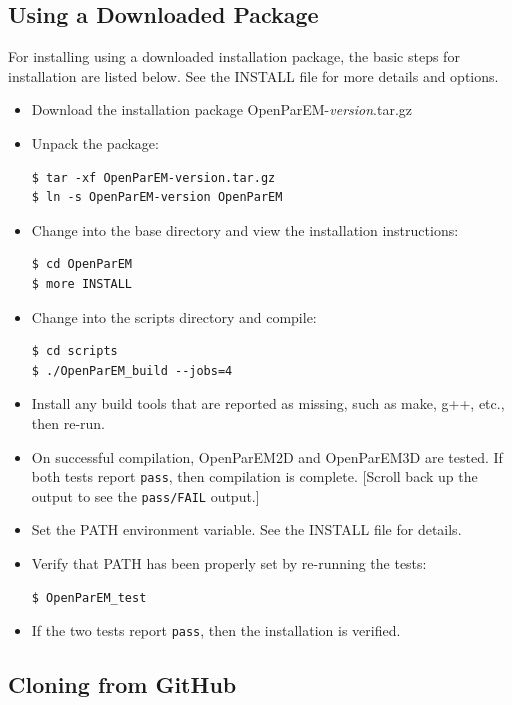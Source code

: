 \documentclass[titlepage]{article}
\renewcommand\_{\textunderscore\linebreak[1]}
\begin{document}
\subsection{Using a Downloaded Package}

For installing using a downloaded installation package, the basic steps for installation are listed below.  See the INSTALL file for more details and options.
\begin{itemize}[nosep]
   \item Download the installation package OpenParEM-\textit{version}.tar.gz
   \item Unpack the package:
         \begin{Verbatim}
$ tar -xf OpenParEM-version.tar.gz
$ ln -s OpenParEM-version OpenParEM
         \end{Verbatim}
   \item Change into the base directory and view the installation instructions:
         \begin{Verbatim}
$ cd OpenParEM
$ more INSTALL
         \end{Verbatim}
   \item Change into the scripts directory and compile:
         \begin{Verbatim}
$ cd scripts
$ ./OpenParEM_build --jobs=4 
         \end{Verbatim}
   \item Install any build tools that are reported as missing, such as make, g++, etc., then re-run.
   \item On successful compilation, OpenParEM2D and OpenParEM3D are tested.  If both tests report \texttt{pass}, then compilation is complete. [Scroll back up the output to see the \texttt{pass/FAIL} output.]
   \item Set the PATH environment variable.  See the INSTALL file for details.
   \item Verify that PATH has been properly set by re-running the tests:
         \begin{Verbatim}
$ OpenParEM_test
         \end{Verbatim}
   \item If the two tests report \texttt{pass}, then the installation is verified.
\end{itemize}

\subsection{Cloning from GitHub}
\end{document}
